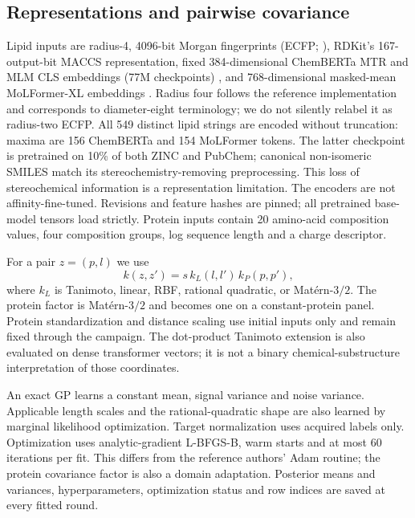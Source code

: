 \documentclass[wcp]{jmlr}
\begin{document}
\subsection{Representations and pairwise covariance}
Lipid inputs are radius-4, 4096-bit Morgan fingerprints (ECFP; \citealp{rogers2010}), RDKit's
167-output-bit MACCS representation, fixed 384-dimensional
ChemBERTa MTR and MLM CLS embeddings (77M checkpoints)
\citep{chemberta}, and 768-dimensional masked-mean MoLFormer-XL embeddings
\citep{ross2022}. Radius four follows the reference
implementation and corresponds to diameter-eight terminology; we do not
silently relabel it as radius-two ECFP. All 549 distinct lipid strings are
encoded without truncation: maxima are 156 ChemBERTa and 154 MoLFormer tokens.
The latter checkpoint is pretrained on 10\% of both ZINC and PubChem;
canonical non-isomeric SMILES match its stereochemistry-removing preprocessing.
This loss of stereochemical information is a representation limitation.
The encoders are not affinity-fine-tuned. Revisions and feature hashes are
pinned; all pretrained base-model tensors load strictly. Protein inputs contain 20 amino-acid composition values,
four composition groups, log sequence length and a charge descriptor.

For a pair $z=(p,l)$ we use
\begin{equation}
k(z,z')=s\,k_L(l,l')\,k_P(p,p'),
\end{equation}
where $k_L$ is Tanimoto, linear, RBF, rational quadratic, or Mat\'ern-$3/2$.
The protein factor is Mat\'ern-$3/2$ and becomes one on a constant-protein
panel. Protein standardization and distance scaling use initial inputs
only and remain fixed through the campaign. The dot-product Tanimoto
extension is also evaluated on dense transformer vectors; it is not a binary
chemical-substructure interpretation of those coordinates.

An exact GP \citep{rasmussen2006} learns a constant mean, signal variance
and noise variance. Applicable length scales and the rational-quadratic
shape are also learned by marginal likelihood optimization.
Target normalization uses acquired labels only.
Optimization uses analytic-gradient L-BFGS-B, warm starts and at most 60
iterations per fit. This differs from the reference authors' Adam routine;
the protein covariance factor is also a domain adaptation. Posterior
means and variances, hyperparameters, optimization status and row indices
are saved at every fitted round.
\end{document}
